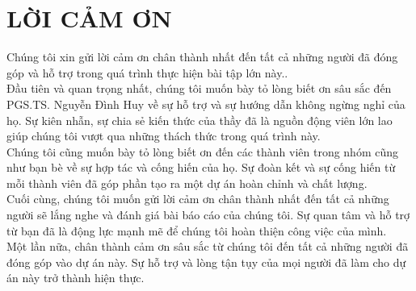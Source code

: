 \documentclass[12pt,a4paper]{report}
\begin{document}
    
    \section*{\centering LỜI CẢM ƠN}
        \hspace{0.5cm} Chúng tôi xin gửi lời cảm ơn chân thành nhất đến tất cả những người đã đóng góp và hỗ trợ trong quá trình thực hiện bài tập lớn này..\\

        Đầu tiên và quan trọng nhất, chúng tôi muốn bày tỏ lòng biết ơn sâu sắc đến PGS.TS. Nguyễn Đình Huy về sự hỗ trợ và sự hướng dẫn không ngừng nghỉ của họ. Sự kiên nhẫn, sự chia sẻ kiến thức của thầy đã là nguồn động viên lớn lao giúp chúng tôi vượt qua những thách thức trong quá trình này.\\

        Chúng tôi cũng muốn bày tỏ lòng biết ơn đến các thành viên trong nhóm cũng như bạn bè về sự hợp tác và cống hiến của họ. Sự đoàn kết và sự cống hiến từ mỗi thành viên đã góp phần tạo ra một dự án hoàn chỉnh và chất lượng.\\

        Cuối cùng, chúng tôi muốn gửi lời cảm ơn chân thành nhất đến tất cả những người sẽ lắng nghe và đánh giá bài báo cáo của chúng tôi. Sự quan tâm và hỗ trợ từ bạn đã là động lực mạnh mẽ để chúng tôi hoàn thiện công việc của mình.\\
        
        Một lần nữa, chân thành cảm ơn sâu sắc từ chúng tôi đến tất cả những người đã đóng góp vào dự án này. Sự hỗ trợ và lòng tận tụy của mọi người đã làm cho dự án này trở thành hiện thực.\\
    \tableofcontents
    \listoftables
    \listoffigures
    \newpage
    \normalsize
    
    
    
    
    
    
    
    \nocite{*}
    \printbibliography[title={TÀI LIỆU THAM KHẢO}, heading=bibintoc]
\end{document}
